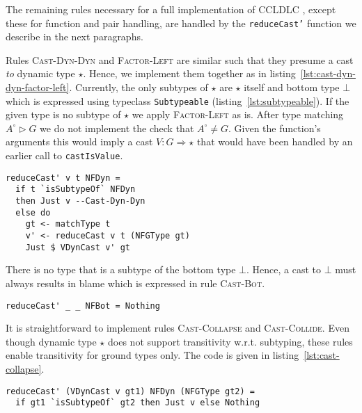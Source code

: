 The remaining rules necessary for a full implementation of CCLDLC , except these for function and pair handling, are handled by the \texttt{reduceCast'} function we describe in the next paragraphs.

Rules \textsc{Cast-Dyn-Dyn} and \textsc{Factor-Left} are similar such that they presume a cast \emph{to} dynamic type $\star$. Hence, we implement them together as in listing~\ref{lst:cast-dyn-dyn-factor-left}. Currently, the only subtypes of $\star$ are $\star$ itself and bottom type $\bot$ which is expressed using typeclass \texttt{Subtypeable} (listing~\ref{lst:subtypeable}). If the given type is no subtype of $\star$ we apply \textsc{Factor-Left} as is. After type matching $A^\circ \rhd G$ we do not implement the check that $A^\circ \neq G$. Given the function's arguments this would imply a cast $V : G \Rightarrow \star$ that would have been handled by an earlier call to \texttt{castIsValue}.

\begin{lstlisting}[float,
  label=lst:cast-dyn-dyn-factor-left,
  caption=Rules \textsc{Cast-Dyn-Dyn} and \textsc{Factor-Left} (\texttt{Interpreter.hs})]
reduceCast' v t NFDyn =
  if t `isSubtypeOf` NFDyn
  then Just v --Cast-Dyn-Dyn
  else do
    gt <- matchType t
    v' <- reduceCast v t (NFGType gt)
    Just $ VDynCast v' gt
\end{lstlisting}

There is no type that is a subtype of the bottom type $\bot$. Hence, a cast to $\bot$ must always results in blame which is expressed in rule \textsc{Cast-Bot}.

\begin{lstlisting}[caption=Rule \textsc{Cast-Bot} (\texttt{Interpreter.hs})]
reduceCast' _ _ NFBot = Nothing
\end{lstlisting}

It is straightforward to implement rules \textsc{Cast-Collapse} and \textsc{Cast-Collide}. Even though dynamic type $\star$ does not support transitivity w.r.t. subtyping, these rules enable transitivity for ground types only. The code is given in listing~\ref{lst:cast-collapse}.

\begin{lstlisting}[float,
  caption=Rules \textsc{Cast-Collapse} and \textsc{Cast-Collide} (\texttt{Interpreter.hs}),
  label=lst:cast-collapse]
reduceCast' (VDynCast v gt1) NFDyn (NFGType gt2) =
  if gt1 `isSubtypeOf` gt2 then Just v else Nothing
\end{lstlisting}

